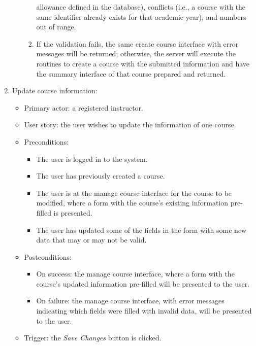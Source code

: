 \begin{enumerate}
\begin{itemize}
\begin{enumerate}
                allowance defined in the database),
                conflicts (i.e., a course with the same identifier  
                already exists for that academic year),
                and numbers out of range.
            \item If the validation fails, the same create course interface
                with error messages will be returned; otherwise, the server will
                execute the routines to create a course with the submitted 
                information and have the summary interface of that course prepared
                and returned.
        \end{enumerate}
\end{itemize}

\item Update course information:
\begin{itemize}
    \item Primary actor: a registered instructor.
    \item User story: the user wishes to update the information of one course.
        \baselineskip
    \item Preconditions:
        \begin{itemize}
            \item The user is logged in to the system.
            \item The user has previously created a course.
            \item The user is at the manage course interface for the course to
                be modified, where a form with
                the course's existing information pre-filled is presented.
            \item The user has updated some of the fields in the form with some
                new data that may or may not be valid.
        \end{itemize}
    \item Postconditions:
        \begin{itemize}
            \item On success: the manage course interface, where a form with
                the course's updated information pre-filled will be presented
                to the user.
            \item On failure: the manage course interface, with error messages
                indicating which fields were filled with invalid data, will be
                presented to the user.
        \end{itemize}
    \item Trigger: the \emph{Save Changes} button is clicked.

\end{itemize}
\end{enumerate}

